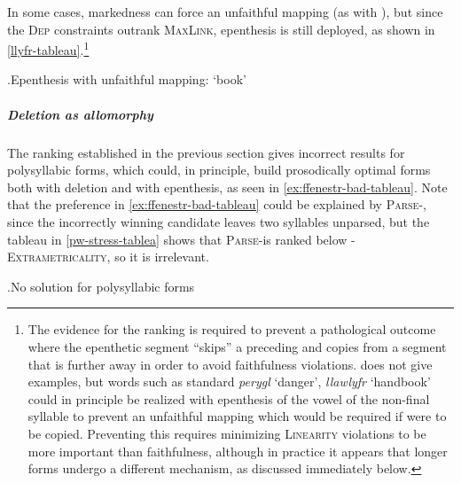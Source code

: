In some cases, markedness can force an unfaithful mapping (as with \ipa{[ˈɬəvir]}), but since the \textsc{Dep} constraints outrank \textsc{MaxLink}, epenthesis is still deployed, as shown in \cref{llyfr-tableau}.\footnote{The evidence for the ranking  is required to prevent a pathological outcome where the epenthetic segment \enquote{skips} a preceding \ipa{[ə]} and copies from a segment that is further away in order to avoid faithfulness violations. \citet{awbery86:_pembr_welsh} does not give examples, but words such as standard \emph{perygl} `danger', \emph{llawlyfr} `handbook' could in principle be realized with epenthesis of the vowel of the non-final syllable to prevent an unfaithful mapping which would be required if \ipa{[ə]} were to be copied. Preventing this requires minimizing \textsc{Linearity} violations to be more important than faithfulness, although in practice it appears that longer forms undergo a different mechanism, as discussed immediately below.}

\ex.\label{llyfr-tableau}Epenthesis with unfaithful mapping: \ipa{[ˈɬəvir]} `book'\\


\subparagraph{Deletion as allomorphy}
\label{sec:delet-as-allom}

The ranking established in the previous section gives incorrect results for polysyllabic forms, which could, in principle, build prosodically optimal forms both with deletion and with epenthesis, as seen in \ref{ex:ffenestr-bad-tableau}. Note that the preference in \ref{ex:ffenestr-bad-tableau} could be explained by \textsc{Parse}-\sy, since the incorrectly winning candidate leaves two syllables unparsed, but the tableau in \ref{pw-stress-tablea} shows that \textsc{Parse}-\sy is ranked below \sy-\textsc{Extrametricality}, so it is irrelevant.

\ex.\label{ex:ffenestr-bad-tableau}No solution for polysyllabic forms\\
\begin{OTtableau}{4}
\end{OTtableau}

